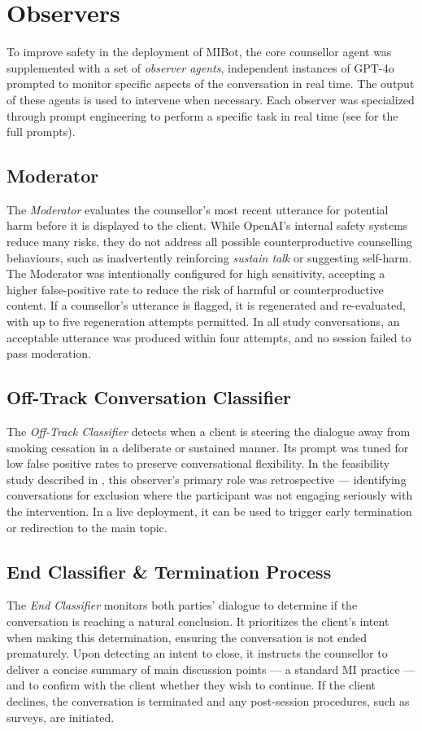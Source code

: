\section{Observers}
\label{sec:observers}
To improve safety in the deployment of MIBot, the core counsellor agent was supplemented with a set of \textit{observer agents}, independent instances of GPT-4o prompted to monitor specific aspects of the conversation in real time. The output of these agents is used to intervene when necessary. Each observer was specialized through prompt engineering to perform a specific task in real time (see  for the full prompts).

\subsection{Moderator}
The \textit{Moderator} evaluates the counsellor's most recent utterance for potential harm before it is displayed to the client. While OpenAI's internal safety systems reduce many risks, they do not address all possible counterproductive counselling behaviours, such as inadvertently reinforcing \emph{sustain talk} or suggesting self-harm. The Moderator was intentionally configured for high sensitivity, accepting a higher false-positive rate to reduce the risk of harmful or counterproductive content. If a counsellor's utterance is flagged, it is regenerated and re-evaluated, with up to five regeneration attempts permitted. In all study conversations, an acceptable utterance was produced within four attempts, and no session failed to pass moderation.

\subsection{Off-Track Conversation Classifier}
The \textit{Off-Track Classifier} detects when a client is steering the dialogue away from smoking cessation in a deliberate or sustained manner. Its prompt was tuned for low false positive rates to preserve conversational flexibility. In the feasibility study described in , this observer's primary role was retrospective --- identifying conversations for exclusion where the participant was not engaging seriously with the intervention. In a live deployment, it can be used to trigger early termination or redirection to the main topic.

\subsection{End Classifier \& Termination Process}
The \textit{End Classifier} monitors both parties' dialogue to determine if the conversation is reaching a natural conclusion. It prioritizes the client's intent when making this determination, ensuring the conversation is not ended prematurely. Upon detecting an intent to close, it instructs the counsellor to deliver a concise summary of main discussion points --- a standard MI practice --- and to confirm with the client whether they wish to continue. If the client declines, the conversation is terminated and any post-session procedures, such as surveys, are initiated.



